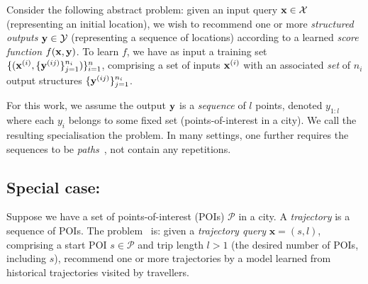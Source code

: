 Consider the following abstract problem:
given an input query $\mathbf{x} \in \mathcal{X}$ (\eg representing an initial location),
we wish to recommend one or more \emph{structured outputs} $\mathbf{y} \in \mathcal{Y}$ (\eg representing a sequence of locations)
according to a learned \emph{score function} $f(\mathbf{x},\mathbf{y})$.
To learn $f$,
we have as input a training set
$\{ ( \mathbf{x}^{({i})}, \{ \mathbf{y}^{({ij})} \}_{j=1}^{n_i} ) \}_{i=1}^{n}$,
comprising a set %
of inputs $\mathbf{x}^{({i})}$ with an associated \emph{set} of $n_i$ output structures $\{ \mathbf{y}^{({ij})} \}_{j=1}^{n_i}$.

For this work, we assume the output $\mathbf{y}$ is a \emph{sequence} of $l$ points, denoted $y_{1:l}$
where each $y_i$ belongs to some fixed set (\eg points-of-interest in a city).
We call the resulting specialisation the \emph{{\seqrec}} problem.
In many settings, one further requires the sequences to be \emph{paths}~\cite{west2001introduction}, \ie not contain any repetitions.





\subsection{Special case: {\trajrec}}

Suppose we have a set of points-of-interest (POIs) $\mathcal{P}$ in a city.
A \emph{trajectory} is a sequence of POIs.
The \emph{\trajrec} problem~\cite{bao2015recommendations,zheng2015trajectory} is:
given a \emph{trajectory query} $\mathbf{x} = (s, l)$,
comprising a start POI $s \in \mathcal{P}$ and trip length
$l \!>\! 1$ (\ie the desired number of POIs, including $s$),
recommend one or more trajectories  %
by a model learned from
historical
trajectories visited by travellers.


